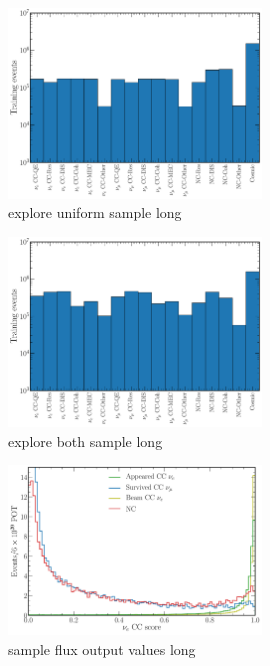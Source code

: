 \begin{figure} %
    \includegraphics[width=0.6\textwidth]{diagrams/7-cvn/chipsnet/explore_uniform_sample.pdf}
    \caption[explore uniform sample short]
    {explore uniform sample long}
    \label{fig:explore_uniform_sample}
\end{figure}

\begin{figure} %
    \includegraphics[width=0.6\textwidth]{diagrams/7-cvn/chipsnet/explore_both_sample.pdf}
    \caption[explore both sample short]
    {explore both sample long}
    \label{fig:explore_both_sample}
\end{figure}

\begin{figure} %
    \includegraphics[width=0.6\textwidth]{diagrams/7-cvn/chipsnet/sample_flux_output_values.pdf}
    \caption[sample flux output values short]
    {sample flux output values long}
    \label{fig:sample_flux_output_values}
\end{figure}

